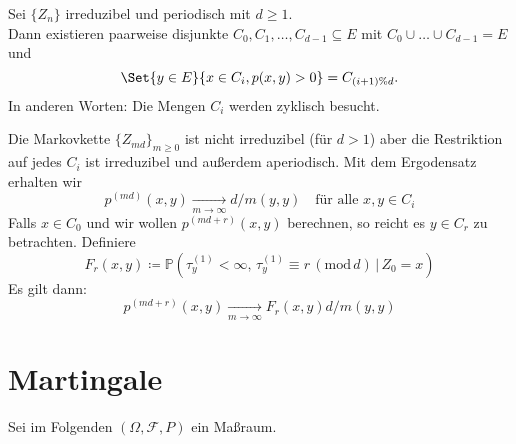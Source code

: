 \documentclass{cheat-sheet}
\renewcommand{\P}{\mathbb{P}} %
\newcommand{\iid}{i.\,i.\,d.} %
\begin{document}

\begin{prop}
  Sei $\{ Z_n \}$ irreduzibel und periodisch mit $d \geq 1$. \\
  Dann existieren paarweise disjunkte $C_0, C_1, \ldots, C_{d-1} \subseteq E$ mit $C_0 \cup \ldots \cup C_{d-1} = E$ und
  \[
    \Set{y \in E}{x \in C_i, p(x, y) > 0} = C_{(i+1) \% d}.
  \]
  In anderen Worten: Die Mengen $C_i$ werden zyklisch besucht.
\end{prop}

\begin{samepage}

\begin{bem}
  Die Markovkette $\{ Z_{md} \}_{m \geq 0}$ ist nicht irreduzibel (für $d > 1$) aber die Restriktion auf jedes $C_i$ ist irreduzibel und außerdem aperiodisch.
  Mit dem Ergodensatz erhalten wir
  \[
    p^{(md)}(x, y) \xrightarrow[m \to \infty]{} d / m(y, y)
    \quad \text{für alle $x, y \in C_i$}
  \]
  Falls $x \in C_0$ und wir wollen $p^{(md + r)}(x, y)$ berechnen, so reicht es $y \in C_r$ zu betrachten.
  Definiere
  \[
    F_r(x, y) \coloneqq \P(\tau_y^{(1)} < \infty, \, \tau_y^{(1)} \equiv r \, (\mathrm{mod}\, d) \,|\, Z_0 = x)
  \]
  Es gilt dann:
  \[
    p^{(md+r)}(x, y) \xrightarrow[m \to \infty]{} F_r(x, y) d / m(y, y)
  \]
\end{bem}


\columnbreak

\section{Martingale}

\end{samepage}


\begin{setting}
  Sei im Folgenden $(\Omega, \mathcal{F}, P)$ ein Maßraum.
\end{setting}
\end{document}
